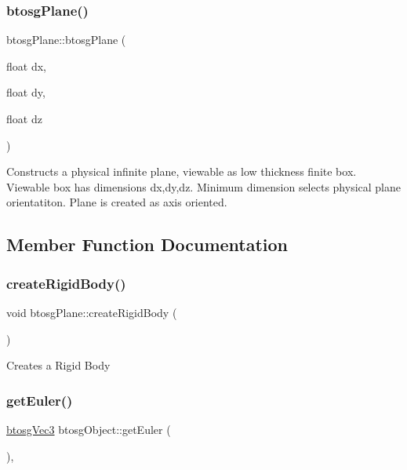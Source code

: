 \subsubsection{\texorpdfstring{btosgPlane()}{btosgPlane()}\hspace{0.1cm}{\footnotesize\ttfamily [3/3]}}
{\footnotesize\ttfamily btosg\+Plane\+::btosg\+Plane (\begin{DoxyParamCaption}\item[{float}]{dx,  }\item[{float}]{dy,  }\item[{float}]{dz }\end{DoxyParamCaption})\hspace{0.3cm}{\ttfamily [inline]}}

Constructs a physical infinite plane, viewable as low thickness finite box. Viewable box has dimensions dx,dy,dz. Minimum dimension selects physical plane orientatiton. Plane is created as axis oriented. 

\subsection{Member Function Documentation}
\mbox{\label{classbtosgPlane_a0e6812c186ed1fa128dccf7cd2e525a6}} 
\subsubsection{\texorpdfstring{createRigidBody()}{createRigidBody()}}
{\footnotesize\ttfamily void btosg\+Plane\+::create\+Rigid\+Body (\begin{DoxyParamCaption}{ }\end{DoxyParamCaption})\hspace{0.3cm}{\ttfamily [inline]}}

Creates a Rigid Body \mbox{\label{classbtosgObject_a2019ec63bde02b72600450c7c985e77a}} 
\subsubsection{\texorpdfstring{getEuler()}{getEuler()}}
{\footnotesize\ttfamily \mbox{\hyperlink{classbtosgVec3}{btosg\+Vec3}} btosg\+Object\+::get\+Euler (\begin{DoxyParamCaption}{ }\end{DoxyParamCaption})\hspace{0.3cm}{\ttfamily [inline]}, {\ttfamily [inherited]}}

